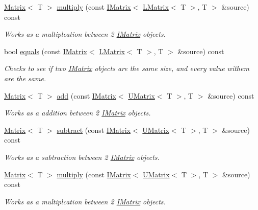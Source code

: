 \begin{DoxyCompactItemize}
\mbox{\hyperlink{class_matrix}{Matrix}}$<$ T $>$ \mbox{\hyperlink{class_l_matrix_a09f9f4cc80fda1508e71aaf72f1366ad}{multiply}} (const \mbox{\hyperlink{class_i_matrix}{I\+Matrix}}$<$ \mbox{\hyperlink{class_l_matrix}{L\+Matrix}}$<$ T $>$, T $>$ \&source) const
\begin{DoxyCompactList}\small\item\em Works as a multiplcation between 2 \mbox{\hyperlink{class_i_matrix}{I\+Matrix}} objects. \end{DoxyCompactList}\item 
bool \mbox{\hyperlink{class_l_matrix_a9b8f4a8601992ef29f01dc29165afb7d}{equals}} (const \mbox{\hyperlink{class_i_matrix}{I\+Matrix}}$<$ \mbox{\hyperlink{class_l_matrix}{L\+Matrix}}$<$ T $>$, T $>$ \&source) const
\begin{DoxyCompactList}\small\item\em Checks to see if two \mbox{\hyperlink{class_i_matrix}{I\+Matrix}} objects are the same size, and every value withem are the same. \end{DoxyCompactList}\item 
\mbox{\hyperlink{class_matrix}{Matrix}}$<$ T $>$ \mbox{\hyperlink{class_l_matrix_a4450ca0e1d32b594d1c1a0da607fed97}{add}} (const \mbox{\hyperlink{class_i_matrix}{I\+Matrix}}$<$ \mbox{\hyperlink{class_u_matrix}{U\+Matrix}}$<$ T $>$, T $>$ \&source) const
\begin{DoxyCompactList}\small\item\em Works as a addition between 2 \mbox{\hyperlink{class_i_matrix}{I\+Matrix}} objects. \end{DoxyCompactList}\item 
\mbox{\hyperlink{class_matrix}{Matrix}}$<$ T $>$ \mbox{\hyperlink{class_l_matrix_ac9aa4095900b986bbc699930be39384e}{subtract}} (const \mbox{\hyperlink{class_i_matrix}{I\+Matrix}}$<$ \mbox{\hyperlink{class_u_matrix}{U\+Matrix}}$<$ T $>$, T $>$ \&source) const
\begin{DoxyCompactList}\small\item\em Works as a subtraction between 2 \mbox{\hyperlink{class_i_matrix}{I\+Matrix}} objects. \end{DoxyCompactList}\item 
\mbox{\hyperlink{class_matrix}{Matrix}}$<$ T $>$ \mbox{\hyperlink{class_l_matrix_afac5ae0da5f4ef8a2d442002d3e8336e}{multiply}} (const \mbox{\hyperlink{class_i_matrix}{I\+Matrix}}$<$ \mbox{\hyperlink{class_u_matrix}{U\+Matrix}}$<$ T $>$, T $>$ \&source) const
\begin{DoxyCompactList}\small\item\em Works as a multiplcation between 2 \mbox{\hyperlink{class_i_matrix}{I\+Matrix}} objects. \end{DoxyCompactList}\item 

\end{DoxyCompactItemize}
